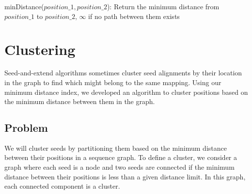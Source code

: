 \documentclass[11pt]{ucscthesis}
\begin{document}
\begin{algorithm}[H]
	\caption[Algorithm for finding the minimum distance between two positions in a variation graph]{minDistance($position\_1, position\_2$): Return the minimum distance from $position\_1$ to $position\_2$, $\infty$ if no path between them exists}
	\label{alg:aim1_min_dist}
\end{algorithm}

\section{Clustering}
Seed-and-extend algorithms sometimes cluster seed alignments by their location in the graph to find which might belong to the same mapping. 
Using our minimum distance index, we developed an algorithm to cluster positions based on the minimum distance between them in the graph.

\subsection{Problem}
We will cluster seeds by partitioning them based on the minimum distance between their positions in a sequence graph. 
To define a cluster, we consider a graph where each seed is a node and two seeds are connected if the minimum distance between their positions is less than a given distance limit. 
In this graph, each connected component is a cluster.
\end{document}
